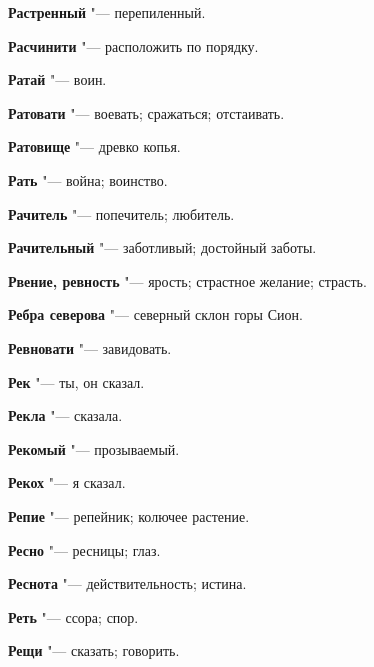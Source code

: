 \begin{mymulticols}{2}
\noindent\textbf{Растренный} "--- перепиленный. 




\noindent\textbf{Расчинити} "--- расположить по порядку. 




\noindent\textbf{Ратай} "--- воин. 




\noindent\textbf{Ратовати} "--- воевать; сражаться; отстаивать. 




\noindent\textbf{Ратовище} "--- древко копья. 




\noindent\textbf{Рать} "--- война; воинство. 




\noindent\textbf{Рачитель} "--- попечитель; любитель. 




\noindent\textbf{Рачительный} "--- заботливый; достойный заботы. 




\noindent\textbf{Рвение, ревность} "--- ярость; страстное желание; страсть. 




\noindent\textbf{Ребра северова} "--- северный склон горы Сион. 




\noindent\textbf{Ревновати} "--- завидовать. 




\noindent\textbf{Рек} "--- ты, он сказал. 




\noindent\textbf{Рекла} "--- сказала. 




\noindent\textbf{Рекомый} "--- прозываемый. 




\noindent\textbf{Рекох} "--- я сказал. 




\noindent\textbf{Репие} "--- репейник; колючее растение. 




\noindent\textbf{Ресно} "--- ресницы; глаз. 




\noindent\textbf{Реснота} "--- действительность; истина. 




\noindent\textbf{Реть} "--- ссора; спор. 




\noindent\textbf{Рещи} "--- сказать; говорить. 





\end{mymulticols}
